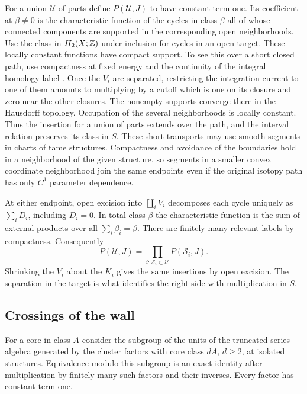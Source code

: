 For a union $\mathscr U$ of parts define $P(\mathscr U,J)$ to have
constant term one. Its coefficient at $\beta\ne0$ is the characteristic
function of the cycles in class $\beta$ all of whose connected
components are supported in the corresponding open neighborhoods. Use
the class in $H_2(X;\mathbb Z)$ under inclusion for cycles in an open target.
These locally constant functions have compact support. To see this over
a short closed path, use compactness at fixed energy and the continuity
of the integral homology label \cite[Theorem~2.11 and Remark~2.13]{DIW}.
Once the $V_i$ are separated, restricting the integration current to
one of them amounts to multiplying by a cutoff which is one on its
closure and zero near the other closures. The nonempty supports converge
there in the Hausdorff topology. Occupation of the several neighborhoods
is locally constant. Thus the insertion for a union of parts extends
over the path, and the interval relation preserves its class in $S$.
These short transports may use smooth segments in charts of tame
structures. Compactness and avoidance of the boundaries hold in a
neighborhood of the given structure, so segments in a smaller convex
coordinate neighborhood join the same endpoints even if the original
isotopy path has only $C^1$ parameter dependence.

At either endpoint, open excision into $\coprod_i V_i$ decomposes each
cycle uniquely as $\sum_i D_i$, including $D_i=0$. In total class
$\beta$ the characteristic function is the sum of external products
over all $\sum_i\beta_i=\beta$. There are finitely many relevant
labels by compactness. Consequently
\begin{equation}\label{eq:excision}
                P(\mathscr U,J)=\prod_{i:\,\mathscr S_i\subset\mathscr U}
                                    P(\mathscr S_i,J).
\end{equation}
Shrinking the $V_i$ about the $K_i$ gives the same insertions by open
excision. The separation in the target is what identifies the right
side with multiplication in $S$.

\subsection{Crossings of the wall}
For a core in class $A$ consider the subgroup of the units of the
truncated series algebra generated by the cluster factors with core
class $dA$, $d\ge2$, at isolated structures. Equivalence modulo this
subgroup is an exact identity after multiplication by finitely many
such factors and their inverses. Every factor has constant term one.


